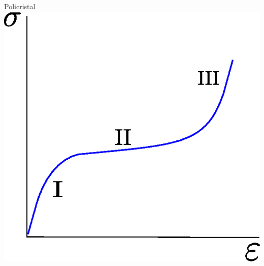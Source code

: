 \documentclass[usenames,dvipsnames]{beamer}
\begin{document}
\begin{frame}
\begin{columns}
\begin{block}{Policristal}
\includegraphics[height=0.35\textheight]{img/intro/SigmavsDefPoli.eps}
\end{block}

\end{columns}

 
\end{frame}
\end{document}
